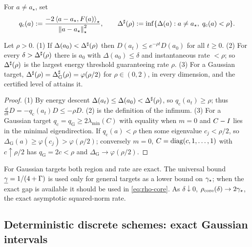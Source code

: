 \begin{definition}
\label{def:sharp}
For $a\neq a_\star$, set
\[
    q_{\mathrm c}(a):=\frac{-2\left\langle a-a_\star,F(a)\right\rangle_\star}{\left\lVert a-a_\star\right\rVert_\star^2},
    \qquad
    \Delta^{\sharp}(\rho):=\inf\{\Delta(a):a\neq a_\star,\;q_{\mathrm c}(a)<\rho\}.
\]
\end{definition}

\begin{proposition}
\label{prop:sharp}
Let $\rho>0$. (1) If $\Delta(a_0)<\Delta^{\sharp}(\rho)$ then $D(a_t)\leq e^{-\rho t}D(a_0)$ for all
$t\geq0$. (2) For every $\delta>\Delta^{\sharp}(\rho)$ there is $a_0$ with $\Delta(a_0)\leq\delta$ and
instantaneous rate $<\rho$; so $\Delta^{\sharp}(\rho)$ is the largest energy threshold guaranteeing rate
$\rho$. (3) For a Gaussian target, $\Delta^{\sharp}(\rho)=\Delta^{\sharp}_{\mathrm G}(\rho)=\varphi(\rho/2)$ for
$\rho\in(0,2)$, in every dimension, and the certified level of  attains it.
\end{proposition}

\begin{proof}
(1) By energy descent $\Delta(a_t)\leq\Delta(a_0)<\Delta^{\sharp}(\rho)$, so $q_{\mathrm c}(a_t)\geq\rho$;
thus $\tfrac{\dd}{\dd t}D=-q_{\mathrm c}(a_t)D\leq-\rho D$. (2) is the definition of the infimum.
(3) For a Gaussian target $q_{\mathrm c}=q_{\mathrm G}\geq2\lambda_{\min}(C)$ with equality when
$m=0$ and $C-I$ lies in the minimal eigendirection. If $q_{\mathrm c}(a)<\rho$ then some
eigenvalue $c_j<\rho/2$, so $\Delta_{\mathrm G}(a)\geq\varphi(c_j)>\varphi(\rho/2)$; conversely $m=0$,
$C=\operatorname{diag}(c,1,\dots,1)$ with $c\uparrow\rho/2$ has $q_{\mathrm G}=2c<\rho$ and
$\Delta_{\mathrm G}\to\varphi(\rho/2)$.
\end{proof}

\begin{remark}
\label{rem:rate-region}
For Gaussian targets both region and rate are exact. The universal bound $\underline{\gamma}=1/(4+\Gamma)$ is
used only for general targets as a lower bound on $\gamma_\star$; when the exact gap is available it
should be used in \eqref{eq:rho-core}. As $\delta\downarrow0$, $\rho_{\mathrm{core}}(\delta)\to2\gamma_\star$,
the exact asymptotic squared-norm rate.
\end{remark}

\subsection{Deterministic discrete schemes: exact Gaussian intervals}
\label{subsec:disc-local}

